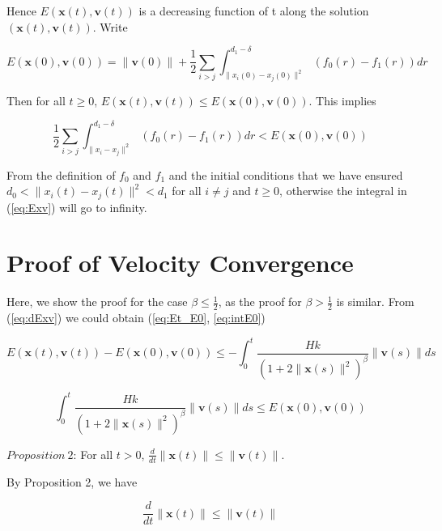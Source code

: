 \noindent
Hence $E(\mathbf{x}(t), \mathbf{v}(t))$ is a decreasing function of t along the solution $(\mathbf{x}(t), \mathbf{v}(t))$. Write

\begin{equation}\label{eq:E0}
E(\mathbf{x}(0), \mathbf{v}(0))=\|\mathbf{v}(0)\|+\frac{1}{2}\sum_{i>j}\int_{\|x_i(0)-x_j(0)\|^2}^{d_1-\delta}(f_0(r)-f_1(r))dr
\end{equation}

\noindent
Then for all $t\geq0$, $E(\mathbf{x}(t), \mathbf{v}(t))\leq E(\mathbf{x}(0), \mathbf{v}(0))$. This implies

\begin{equation}
\frac{1}{2}\sum_{i>j}\int_{\|x_i-x_j\|^2}^{d_1-\delta}(f_0(r)-f_1(r))dr<E(\mathbf{x}(0), \mathbf{v}(0))
\end{equation}

\noindent
From the definition of $f_0$ and $f_1$ and the initial conditions that we have ensured $d_0<\|x_i(t)-x_j(t)\|^2<d_1$ for all $i\neq j$ and $t\geq0$, otherwise the integral in (\ref{eq:Exv}) will go to infinity.

\section{Proof of Velocity Convergence}

Here, we show the proof for the case $\beta\leq\frac{1}{2}$, as the proof for $\beta>\frac{1}{2}$ is similar. From (\ref{eq:dExv}) we could obtain (\ref{eq:Et_E0}, \ref{eq:intE0})

\begin{equation}\label{eq:Et_E0}
E(\mathbf{x}(t), \mathbf{v}(t))-E(\mathbf{x}(0), \mathbf{v}(0))\leq-\int_0^t\frac{Hk}{(1+2\|\mathbf{x}(s)\|^2)^{\beta}}\|\mathbf{v}(s)\|ds
\end{equation}

\begin{equation}\label{eq:intE0}
\int_0^t\frac{Hk}{(1+2\|\mathbf{x}(s)\|^2)^{\beta}}\|\mathbf{v}(s)\|ds\leq E(\mathbf{x}(0), \mathbf{v}(0))
\end{equation}

$\mathit{Proposition\ 2}$: For all $t>0$, $\frac{d}{dt}\|\mathbf{x}(t)\|\leq\|\mathbf{v}(t)\|$.

By Proposition 2, we have

\begin{equation}\label{eq:proposition2}
\frac{d}{dt}\|\mathbf{x}(t)\|\leq\|\mathbf{v}(t)\|
\end{equation}

